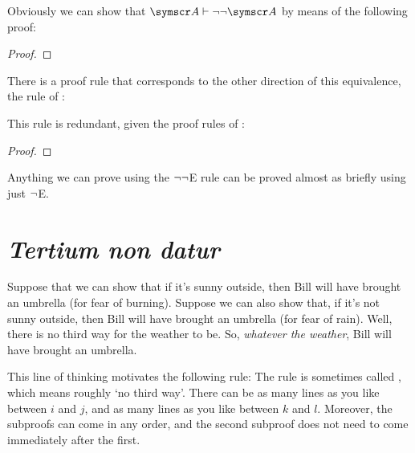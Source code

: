 Obviously we can show that $\meta{A} \proves \enot\enot\meta{A}$ by means of the following proof:
\begin{proof}
\open
{}
\close
{}	
\end{proof}

There is a proof rule that corresponds to the other direction of this equivalence, the rule of :


This rule is redundant, given the proof rules of \TFL: \begin{proof}
	\open
	\close
\end{proof}
Anything we can prove using the $\neg\neg$E rule can be proved almost as briefly using just $\neg$E.



\section{\emph{Tertium non datur}}\label{aprtnd}

Suppose that we can show that if it's sunny outside, then Bill will have brought an umbrella (for fear of burning). Suppose we can also show that, if it's not sunny outside, then Bill will have brought an umbrella (for fear of rain). Well, there is no third way for the weather to be. So, \emph{whatever the weather}, Bill will have brought an umbrella. 

This line of thinking motivates the following rule:
The rule is sometimes called , which means roughly `no third way'. There can be as many lines as you like between $i$ and $j$, and as many lines as you like between $k$ and $l$. Moreover, the subproofs can come in any order, and the second subproof does not need to come immediately after the first.

